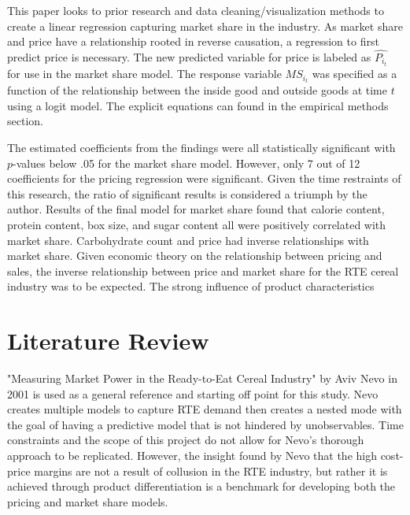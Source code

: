 \documentclass[12pt,english]{article}
\begin{document}
\tab This paper looks to prior research and data cleaning/visualization methods to create a linear regression capturing market share in the industry. As market share and price have a relationship rooted in reverse causation, a regression to first predict price is necessary. The new predicted variable for price is labeled as $\widehat{P_i_t}$ for use in the market share model. The response variable $MS_i_t$ was specified as a function of the relationship between the inside good and outside goods at time $t$ using a logit model. The explicit equations can found in the empirical methods section.

\tab The estimated coefficients from the findings were all statistically significant with $p$-values below .05 for the market share model. However, only 7 out of 12 coefficients for the pricing regression were significant. Given the time restraints of this research, the ratio of significant results is considered a triumph by the author. Results of the final model for market share found that calorie content, protein content, box size, and sugar content all were positively correlated with market share. Carbohydrate count and price had inverse relationships with market share. Given economic theory on the relationship between pricing and sales, the inverse relationship between price and market share for the RTE cereal industry was to be expected. The strong influence of product characteristics 

\section{Literature Review}

\tab "Measuring Market Power in the Ready-to-Eat Cereal Industry" by Aviv Nevo in 2001 is used as a general reference and starting off point for this study. Nevo creates multiple models to capture RTE demand then creates a nested mode with the goal of having a predictive model that is not hindered by unobservables. Time constraints and the scope of this project do not allow for Nevo's thorough approach to be replicated. However, the insight found by Nevo that the high cost-price margins are not a result of collusion in the RTE industry, but rather it is achieved through product differentiation is a benchmark for developing both the pricing and market share models.
\end{document}
